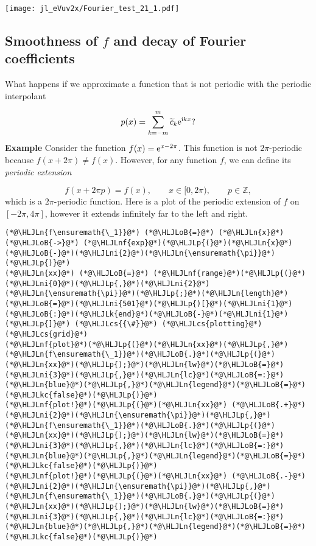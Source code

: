 \documentclass[12pt,a4paper]{article}
\newcommand{\HLJLk}[1]{\textcolor[RGB]{148,91,176}{\textbf{#1}}}
\newcommand{\HLJLkc}[1]{\textcolor[RGB]{59,151,46}{\textit{#1}}}
\newcommand{\HLJLn}[1]{#1}
\newcommand{\HLJLnf}[1]{\textcolor[RGB]{66,102,213}{#1}}
\newcommand{\HLJLni}[1]{\textcolor[RGB]{59,151,46}{#1}}
\newcommand{\HLJLoB}[1]{\textcolor[RGB]{102,102,102}{\textbf{#1}}}
\newcommand{\HLJLp}[1]{#1}
\newcommand{\HLJLcs}[1]{\textcolor[RGB]{153,153,119}{\textit{#1}}}
\begin{document}
\texttt{[image: jl\_eVuv2x/Fourier\_test\_21\_1.pdf]}

\subsection{Smoothness of $f$ and decay of Fourier coefficients}
What happens if we approximate a function that is not periodic with the periodic interpolant

\[
p(x) = \sum_{k=-m}^{m}\widetilde{c}_k{\rm e}^{{\rm i}kx}?
\]
\textbf{Example} Consider the function $f(x) = {\rm e}^{x-2\pi}$. This function is not  $2\pi$-periodic because $f(x + 2\pi) \neq f(x)$. However, for any function $f$, we can define its \emph{periodic extension}

\[
f(x + 2\pi p) = f(x), \qquad x \in [0, 2\pi), \qquad p \in \mathbb{Z},
\]
which is a $2\pi$-periodic function.  Here is a plot of the periodic extension of $f$ on $[-2\pi, 4\pi]$, however it extends infinitely far to the left and right.


\begin{lstlisting}
(*@\HLJLn{f\ensuremath{\_1}}@*) (*@\HLJLoB{=}@*) (*@\HLJLn{x}@*) (*@\HLJLoB{->}@*) (*@\HLJLnf{exp}@*)(*@\HLJLp{(}@*)(*@\HLJLn{x}@*)(*@\HLJLoB{-}@*)(*@\HLJLni{2}@*)(*@\HLJLn{\ensuremath{\pi}}@*)(*@\HLJLp{)}@*)
(*@\HLJLn{xx}@*) (*@\HLJLoB{=}@*) (*@\HLJLnf{range}@*)(*@\HLJLp{(}@*)(*@\HLJLni{0}@*)(*@\HLJLp{,}@*)(*@\HLJLni{2}@*)(*@\HLJLn{\ensuremath{\pi}}@*)(*@\HLJLp{;}@*)(*@\HLJLn{length}@*)(*@\HLJLoB{=}@*)(*@\HLJLni{501}@*)(*@\HLJLp{)[}@*)(*@\HLJLni{1}@*)(*@\HLJLoB{:}@*)(*@\HLJLk{end}@*)(*@\HLJLoB{-}@*)(*@\HLJLni{1}@*)(*@\HLJLp{]}@*) (*@\HLJLcs{{\#}}@*) (*@\HLJLcs{plotting}@*) (*@\HLJLcs{grid}@*)
(*@\HLJLnf{plot}@*)(*@\HLJLp{(}@*)(*@\HLJLn{xx}@*)(*@\HLJLp{,}@*)(*@\HLJLn{f\ensuremath{\_1}}@*)(*@\HLJLoB{.}@*)(*@\HLJLp{(}@*)(*@\HLJLn{xx}@*)(*@\HLJLp{);}@*)(*@\HLJLn{lw}@*)(*@\HLJLoB{=}@*)(*@\HLJLni{3}@*)(*@\HLJLp{,}@*)(*@\HLJLn{lc}@*)(*@\HLJLoB{=:}@*)(*@\HLJLn{blue}@*)(*@\HLJLp{,}@*)(*@\HLJLn{legend}@*)(*@\HLJLoB{=}@*)(*@\HLJLkc{false}@*)(*@\HLJLp{)}@*)
(*@\HLJLnf{plot!}@*)(*@\HLJLp{(}@*)(*@\HLJLn{xx}@*) (*@\HLJLoB{.+}@*) (*@\HLJLni{2}@*)(*@\HLJLn{\ensuremath{\pi}}@*)(*@\HLJLp{,}@*)(*@\HLJLn{f\ensuremath{\_1}}@*)(*@\HLJLoB{.}@*)(*@\HLJLp{(}@*)(*@\HLJLn{xx}@*)(*@\HLJLp{);}@*)(*@\HLJLn{lw}@*)(*@\HLJLoB{=}@*)(*@\HLJLni{3}@*)(*@\HLJLp{,}@*)(*@\HLJLn{lc}@*)(*@\HLJLoB{=:}@*)(*@\HLJLn{blue}@*)(*@\HLJLp{,}@*)(*@\HLJLn{legend}@*)(*@\HLJLoB{=}@*)(*@\HLJLkc{false}@*)(*@\HLJLp{)}@*)
(*@\HLJLnf{plot!}@*)(*@\HLJLp{(}@*)(*@\HLJLn{xx}@*) (*@\HLJLoB{.-}@*) (*@\HLJLni{2}@*)(*@\HLJLn{\ensuremath{\pi}}@*)(*@\HLJLp{,}@*)(*@\HLJLn{f\ensuremath{\_1}}@*)(*@\HLJLoB{.}@*)(*@\HLJLp{(}@*)(*@\HLJLn{xx}@*)(*@\HLJLp{);}@*)(*@\HLJLn{lw}@*)(*@\HLJLoB{=}@*)(*@\HLJLni{3}@*)(*@\HLJLp{,}@*)(*@\HLJLn{lc}@*)(*@\HLJLoB{=:}@*)(*@\HLJLn{blue}@*)(*@\HLJLp{,}@*)(*@\HLJLn{legend}@*)(*@\HLJLoB{=}@*)(*@\HLJLkc{false}@*)(*@\HLJLp{)}@*)
\end{lstlisting}
\end{document}

